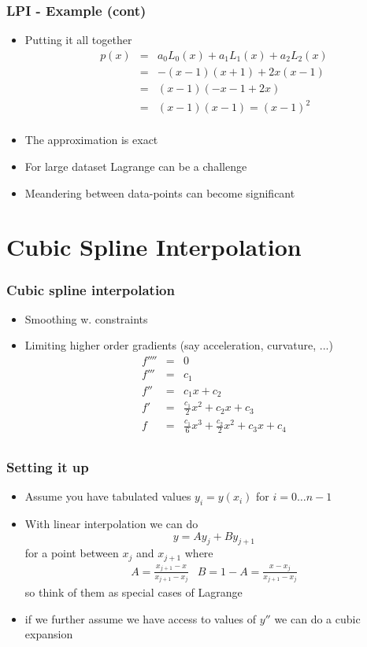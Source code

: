 \documentclass[10pt]{beamer}
\begin{document}
\begin{frame}
  \frametitle{LPI - Example (cont)}
  \begin{itemize}
  \item Putting it all together
    \[
      \begin{array}{lll}
        p(x) & = & a_0 L_0(x) + a_1 L_1(x) + a_2 L_2(x)\\
             & = & -(x-1)(x+1) + 2 x (x-1) \\
             & = & (x-1) ( -x - 1 + 2x)\\
             & = & (x-1) (x-1) = (x-1)^2\\
      \end{array}
    \] \pause
    \item The approximation is exact
    \item For large dataset Lagrange can be a challenge
    \item Meandering between data-points can become significant
  \end{itemize}
\end{frame}

\section{Cubic Spline Interpolation}

\begin{frame}
  \frametitle{Cubic spline interpolation}
  \begin{itemize}
  \item Smoothing w. constraints 
  \item Limiting higher order gradients (say acceleration, curvature, ...)
    \[
      \begin{array}{lll}
        f'''' & = & 0\\
        f'''  & = & c_1\\
        f''   & = & c_1 x + c_2\\
        f'    & = & \frac{c_1}{2} x^2 + c_2 x + c_ 3\\
        f     & = & \frac{c_1}{6} x^3 + \frac{c_2}{2} x^2 + c_3 x + c_4\\                    
      \end{array}
    \]
  \end{itemize}
\end{frame}
\begin{frame}
  \frametitle{Setting it up}
  \begin{itemize}
  \item Assume you have tabulated values $y_i = y(x_i)$ for $i = 0 \ldots n-1$
  \item With linear interpolation we can do
    \[
      y = A y_j + B y_{j+1}
    \] for a point between $x_j$ and $x_{j+1}$ where
    \[
      \begin{array}{ll}
        A = \frac{x_{j+1} - x}{x_{j+1}-x_j} & B = 1-A = \frac{x - x_j}{x_{j+1} - x_j}
      \end{array}
    \] so think of them as special cases of Lagrange
  \item if we further assume we have access to values of $y''$ we can do a cubic expansion
  \end{itemize}
\end{frame}
\end{document}
